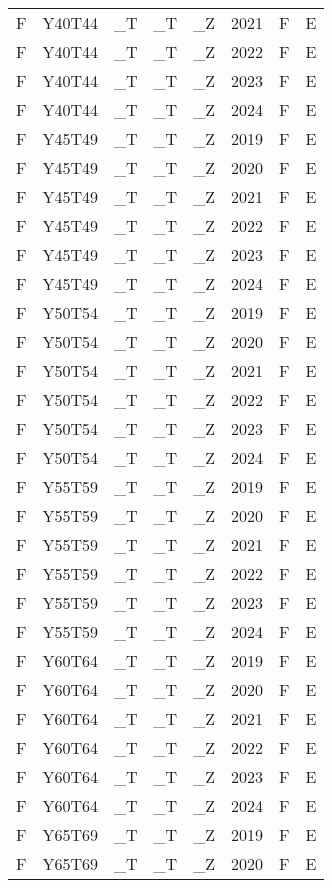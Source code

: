 \begin{longtable}[t]{llllllll}
F & Y40T44 & \_T & \_T & \_Z & 2021 & F & E\\
F & Y40T44 & \_T & \_T & \_Z & 2022 & F & E\\
F & Y40T44 & \_T & \_T & \_Z & 2023 & F & E\\
F & Y40T44 & \_T & \_T & \_Z & 2024 & F & E\\
\addlinespace
F & Y45T49 & \_T & \_T & \_Z & 2019 & F & E\\
F & Y45T49 & \_T & \_T & \_Z & 2020 & F & E\\
F & Y45T49 & \_T & \_T & \_Z & 2021 & F & E\\
F & Y45T49 & \_T & \_T & \_Z & 2022 & F & E\\
F & Y45T49 & \_T & \_T & \_Z & 2023 & F & E\\
\addlinespace
F & Y45T49 & \_T & \_T & \_Z & 2024 & F & E\\
F & Y50T54 & \_T & \_T & \_Z & 2019 & F & E\\
F & Y50T54 & \_T & \_T & \_Z & 2020 & F & E\\
F & Y50T54 & \_T & \_T & \_Z & 2021 & F & E\\
F & Y50T54 & \_T & \_T & \_Z & 2022 & F & E\\
\addlinespace
F & Y50T54 & \_T & \_T & \_Z & 2023 & F & E\\
F & Y50T54 & \_T & \_T & \_Z & 2024 & F & E\\
F & Y55T59 & \_T & \_T & \_Z & 2019 & F & E\\
F & Y55T59 & \_T & \_T & \_Z & 2020 & F & E\\
F & Y55T59 & \_T & \_T & \_Z & 2021 & F & E\\
\addlinespace
F & Y55T59 & \_T & \_T & \_Z & 2022 & F & E\\
F & Y55T59 & \_T & \_T & \_Z & 2023 & F & E\\
F & Y55T59 & \_T & \_T & \_Z & 2024 & F & E\\
F & Y60T64 & \_T & \_T & \_Z & 2019 & F & E\\
F & Y60T64 & \_T & \_T & \_Z & 2020 & F & E\\
\addlinespace
F & Y60T64 & \_T & \_T & \_Z & 2021 & F & E\\
F & Y60T64 & \_T & \_T & \_Z & 2022 & F & E\\
F & Y60T64 & \_T & \_T & \_Z & 2023 & F & E\\
F & Y60T64 & \_T & \_T & \_Z & 2024 & F & E\\
F & Y65T69 & \_T & \_T & \_Z & 2019 & F & E\\
\addlinespace
F & Y65T69 & \_T & \_T & \_Z & 2020 & F & E\\

\end{longtable}
